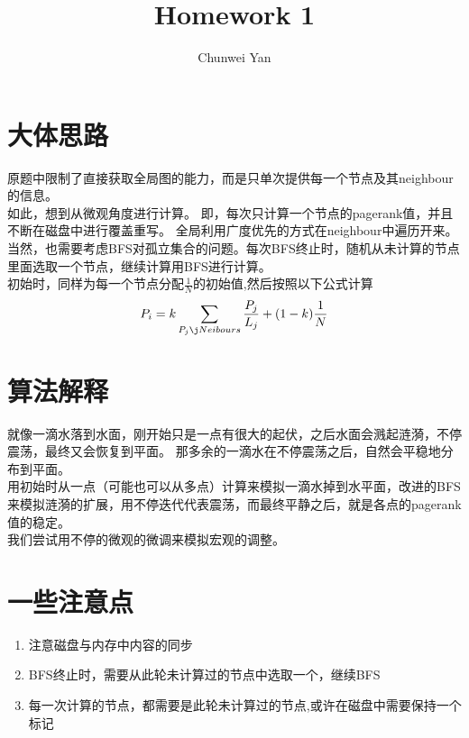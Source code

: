 \documentclass[a4paper]{ctexart}
\author{Chunwei Yan}
\title{Homework 1}
\begin{document}
    \maketitle
\section{大体思路}
原题中限制了直接获取全局图的能力，而是只单次提供每一个节点及其neighbour的信息。\\
如此，想到从微观角度进行计算。 即，每次只计算一个节点的pagerank值，并且不断在磁盘中进行覆盖重写。 全局利用广度优先的方式在neighbour中遍历开来。当然，也需要考虑BFS对孤立集合的问题。每次BFS终止时，随机从未计算的节点里面选取一个节点，继续计算用BFS进行计算。 \\
初始时，同样为每一个节点分配$\frac{1}{N}$的初始值,然后按照以下公式计算
$$
P_i = k\sum_{P_j \j Neibours}{\frac{P_j}{L_j}} + (1-k)\frac{1}{N}
$$
\section{算法解释}
就像一滴水落到水面，刚开始只是一点有很大的起伏，之后水面会溅起涟漪，不停震荡，最终又会恢复到平面。 那多余的一滴水在不停震荡之后，自然会平稳地分布到平面。\\
用初始时从一点（可能也可以从多点）计算来模拟一滴水掉到水平面，改进的BFS来模拟涟漪的扩展，用不停迭代代表震荡，而最终平静之后，就是各点的pagerank值的稳定。\\
我们尝试用不停的微观的微调来模拟宏观的调整。\\
\section{一些注意点}
\begin{enumerate}
    \item 注意磁盘与内存中内容的同步
    \item BFS终止时，需要从此轮未计算过的节点中选取一个，继续BFS
    \item 每一次计算的节点，都需要是此轮未计算过的节点,或许在磁盘中需要保持一个标记
\end{enumerate}
\end{document}
